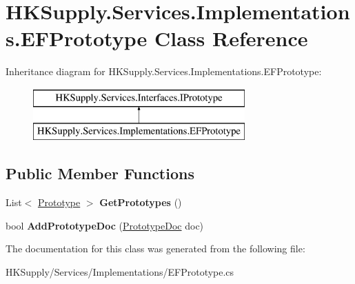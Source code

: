 \hypertarget{class_h_k_supply_1_1_services_1_1_implementations_1_1_e_f_prototype}{}\section{H\+K\+Supply.\+Services.\+Implementations.\+E\+F\+Prototype Class Reference}
\label{class_h_k_supply_1_1_services_1_1_implementations_1_1_e_f_prototype}
Inheritance diagram for H\+K\+Supply.\+Services.\+Implementations.\+E\+F\+Prototype\+:\begin{figure}[H]
\begin{center}
\leavevmode
\includegraphics[height=2.000000cm]{class_h_k_supply_1_1_services_1_1_implementations_1_1_e_f_prototype}
\end{center}
\end{figure}
\subsection*{Public Member Functions}
\begin{DoxyCompactItemize}
\item 
\mbox{\label{class_h_k_supply_1_1_services_1_1_implementations_1_1_e_f_prototype_ae9995497534eb0595d1096998528c4e8}} 
List$<$ \mbox{\hyperlink{class_h_k_supply_1_1_models_1_1_prototype}{Prototype}} $>$ {\bfseries Get\+Prototypes} ()
\item 
\mbox{\label{class_h_k_supply_1_1_services_1_1_implementations_1_1_e_f_prototype_a39804a815f5e25167c05fb3fa0c6c18a}} 
bool {\bfseries Add\+Prototype\+Doc} (\mbox{\hyperlink{class_h_k_supply_1_1_models_1_1_prototype_doc}{Prototype\+Doc}} doc)
\end{DoxyCompactItemize}


The documentation for this class was generated from the following file\+:\begin{DoxyCompactItemize}
\item 
H\+K\+Supply/\+Services/\+Implementations/E\+F\+Prototype.\+cs\end{DoxyCompactItemize}
